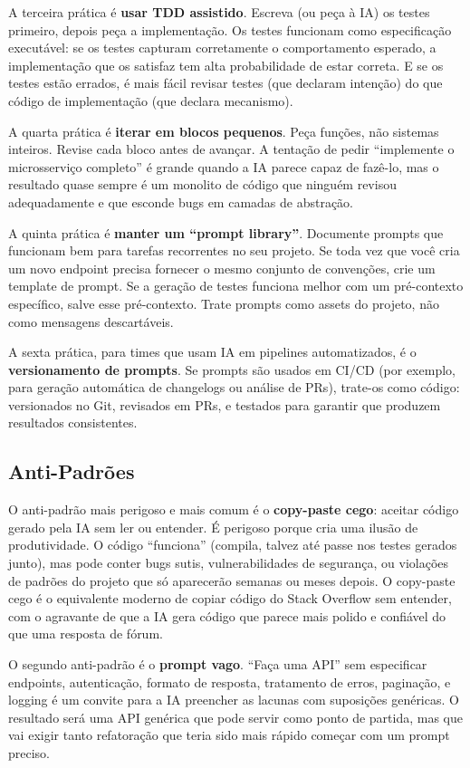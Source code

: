 A terceira prática é \textbf{usar TDD assistido}. Escreva (ou peça à IA) os testes
primeiro, depois peça a implementação. Os testes funcionam como especificação executável:
se os testes capturam corretamente o comportamento esperado, a implementação que os
satisfaz tem alta probabilidade de estar correta. E se os testes estão errados, é mais
fácil revisar testes (que declaram intenção) do que código de implementação (que
declara mecanismo).

A quarta prática é \textbf{iterar em blocos pequenos}. Peça funções, não sistemas
inteiros. Revise cada bloco antes de avançar. A tentação de pedir ``implemente o
microsserviço completo'' é grande quando a IA parece capaz de fazê-lo, mas o resultado
quase sempre é um monolito de código que ninguém revisou adequadamente e que esconde
bugs em camadas de abstração.

A quinta prática é \textbf{manter um ``prompt library''}. Documente prompts que
funcionam bem para tarefas recorrentes no seu projeto. Se toda vez que você cria um
novo endpoint precisa fornecer o mesmo conjunto de convenções, crie um template de
prompt. Se a geração de testes funciona melhor com um pré-contexto específico, salve
esse pré-contexto. Trate prompts como assets do projeto, não como mensagens descartáveis.

A sexta prática, para times que usam IA em pipelines automatizados, é o
\textbf{versionamento de prompts}. Se prompts são usados em CI/CD (por exemplo, para
geração automática de changelogs ou análise de PRs), trate-os como código:
versionados no Git, revisados em PRs, e testados para garantir que produzem resultados
consistentes.

\subsection{Anti-Padrões}

O anti-padrão mais perigoso e mais comum é o \textbf{copy-paste cego}: aceitar código
gerado pela IA sem ler ou entender. É perigoso porque cria uma ilusão de produtividade.
O código ``funciona'' (compila, talvez até passe nos testes gerados junto), mas
pode conter bugs sutis, vulnerabilidades de segurança, ou violações de padrões do
projeto que só aparecerão semanas ou meses depois. O copy-paste cego é o equivalente
moderno de copiar código do Stack Overflow sem entender, com o agravante de que a
IA gera código que parece mais polido e confiável do que uma resposta de fórum.

O segundo anti-padrão é o \textbf{prompt vago}. ``Faça uma API'' sem especificar
endpoints, autenticação, formato de resposta, tratamento de erros, paginação, e
logging é um convite para a IA preencher as lacunas com suposições genéricas. O
resultado será uma API genérica que pode servir como ponto de partida, mas que vai
exigir tanto refatoração que teria sido mais rápido começar com um prompt preciso.


